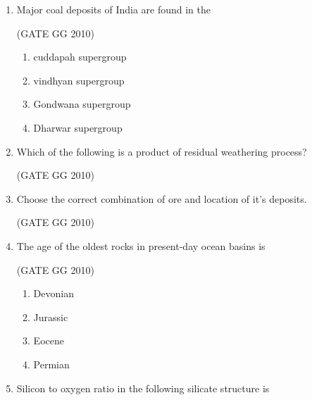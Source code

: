\documentclass[journal]{IEEEtran}
\begin{document}
\begin{enumerate}
\item Major coal deposits of India are found in the

\hfill (GATE GG 2010)
\begin{multicols}{2}

\begin{enumerate}
    \item cuddapah supergroup
    \item vindhyan supergroup
    \item Gondwana supergroup
    \item Dharwar supergroup
\end{enumerate}
\end{multicols}

\item Which of the following is a product of residual weathering process?

\hfill (GATE GG 2010)
\begin{enumerate}
\end{enumerate}

\item Choose the correct combination of ore and location of it's deposits.

\hfill (GATE GG 2010)



\begin{enumerate}
\end{enumerate}

\item The age of the oldest rocks in present-day ocean basins is

\hfill (GATE GG 2010) 
\begin{multicols}{4}

\begin{enumerate}
    \item Devonian
    \item Jurassic
    \item Eocene
    \item Permian
\end{enumerate}
\end{multicols}
\item Silicon to oxygen ratio in the following silicate structure is


\end{enumerate}
\end{document}
